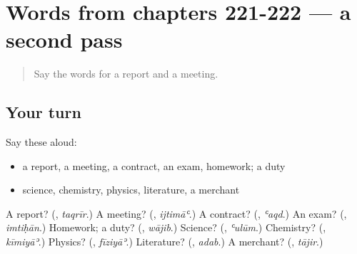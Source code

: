 \section[(dialogue)]{Words from chapters 221-222 — a second pass}

\label{lesson:AR-R222-second-pass-words-from-chapters-221-222}



\begin{quote}
Say the words for a report and a meeting.
\end{quote}

\subsection*{Your turn}
Say these aloud:

\begin{itemize}
\raggedright
  \item a report, a meeting, a contract, an exam, homework; a duty
  \item science, chemistry, physics, literature, a merchant
\end{itemize}

\begin{tcolorbox}[breakable,colback=teal!4,colframe=teal!35!black,title={Before you move on}]
A report? (\textbf{}, \emph{taqrīr}.) A meeting? (\textbf{}, \emph{ijtimāʿ}.) A contract? (\textbf{}, \emph{ʿaqd}.) An exam? (\textbf{}, \emph{imtiḥān}.) Homework; a duty? (\textbf{}, \emph{wājib}.) Science? (\textbf{}, \emph{ʿulūm}.) Chemistry? (\textbf{}, \emph{kīmiyāʾ}.) Physics? (\textbf{}, \emph{fīziyāʾ}.) Literature? (\textbf{}, \emph{adab}.) A merchant? (\textbf{}, \emph{tājir}.)
\end{tcolorbox}
